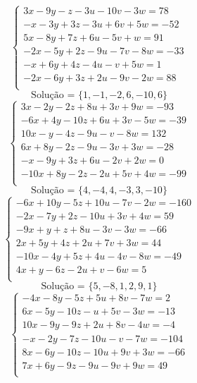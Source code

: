 \documentclass[12pt,oneside,a4paper]{article}
\begin{document}
\vspace{\baselineskip}
\begin{equation*}
\begin{cases}
3x-9y-z-3u-10v-3w=78 \\
-x-3y+3z-3u+6v+5w=-52 \\
5x-8y+7z+6u-5v+w=91 \\
-2x-5y+2z-9u-7v-8w=-33 \\
-x+6y+4z-4u-v+5w=1 \\
-2x-6y+3z+2u-9v-2w=88 \\
\end{cases}
\end{equation*}
\begin{equation*}
\text{Solução = }\{1,-1,-2,6,-10,6\}
\end{equation*}
\vspace{\baselineskip}
\begin{equation*}
\begin{cases}
3x-2y-2z+8u+3v+9w=-93 \\
-6x+4y-10z+6u+3v-5w=-39 \\
10x-y-4z-9u-v-8w=132 \\
6x+8y-2z-9u-3v+3w=-28 \\
-x-9y+3z+6u-2v+2w=0 \\
-10x+8y-2z-2u+5v+4w=-99 \\
\end{cases}
\end{equation*}
\begin{equation*}
\text{Solução = }\{4,-4,4,-3,3,-10\}
\end{equation*}
\vspace{\baselineskip}
\begin{equation*}
\begin{cases}
-6x+10y-5z+10u-7v-2w=-160 \\
-2x-7y+2z-10u+3v+4w=59 \\
-9x+y+z+8u-3v-3w=-66 \\
2x+5y+4z+2u+7v+3w=44 \\
-10x-4y+5z+4u-4v-8w=-49 \\
4x+y-6z-2u+v-6w=5 \\
\end{cases}
\end{equation*}
\begin{equation*}
\text{Solução = }\{5,-8,1,2,9,1\}
\end{equation*}
\vspace{\baselineskip}
\begin{equation*}
\begin{cases}
-4x-8y-5z+5u+8v-7w=2 \\
6x-5y-10z-u+5v-3w=-13 \\
10x-9y-9z+2u+8v-4w=-4 \\
-x-2y-7z-10u-v-7w=-104 \\
8x-6y-10z-10u+9v+3w=-66 \\
7x+6y-9z-9u-9v+9w=49 \\
\end{cases}
\end{equation*}
\end{document}
